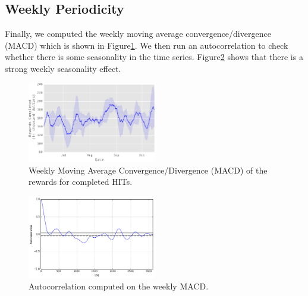 \subsection{Weekly Periodicity}
Finally, we computed the weekly moving average convergence/divergence (MACD) which is shown in Figure\ref{fig:mac}. We then run an autocorrelation to check whether there is some seasonality in the time series. Figure\ref{fig:autocorrelation2} shows that there is a strong weekly seasonality effect.
\begin{figure}[ht]
	\centering
		\includegraphics[width=0.5\textwidth]{figures/mac}
	\caption{Weekly Moving Average Convergence/Divergence (MACD) of the rewards for completed HITs.}
	\label{fig:mac}
\end{figure}
\begin{figure}[ht]
	\centering
		\includegraphics[width=0.5\textwidth]{figures/autocorrelation2}
	\caption{Autocorrelation computed on the weekly MACD.}
	\label{fig:autocorrelation2}
\end{figure}